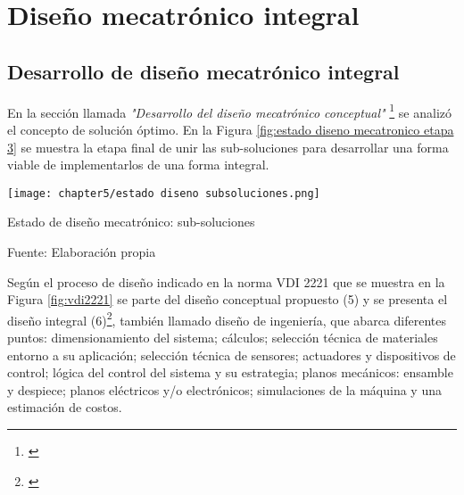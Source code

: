 
\pagestyle{myportland}
\doublespacing
\chapter[\quad\quad\quad\quad ----- Diseño mecatrónico integral]{\\ Diseño mecatrónico integral}
\thispagestyle{myportland}


\section{Desarrollo de diseño mecatrónico integral}
\label{sec:desarrollo de diseno mecatronico integral}

En la sección llamada \textit{"Desarrollo del diseño mecatrónico conceptual"} \footnote{\cite{DiazVergara2020}} se analizó el concepto de solución óptimo. En la Figura \ref{fig:estado diseno mecatronico etapa 3} se muestra la etapa final de unir las sub-soluciones para desarrollar una forma viable de implementarlos de una forma integral.

\begin{myfigure}[H]
	\footnotesize\centering
	\texttt{[image: chapter5/estado diseno subsoluciones.png]}
	\caption{Estado de diseño mecatrónico: sub-soluciones}
	\begin{myflushcenter}
		Fuente: Elaboración propia
	\end{myflushcenter}
	\label{fig:estado diseno mecatronico etapa 3}
\end{myfigure}

Según el proceso de diseño indicado en la norma VDI 2221 que se muestra en la Figura \ref{fig:vdi2221} se parte del diseño conceptual propuesto (5) y se presenta el diseño integral (6)\footnote{\cite{Pahl2007}}, también llamado diseño de ingeniería, que abarca diferentes puntos: dimensionamiento del sistema; cálculos; selección técnica de materiales entorno a su aplicación; selección técnica de sensores; actuadores y dispositivos de control; lógica del control del sistema y su estrategia; planos mecánicos: ensamble y despiece; planos eléctricos y/o electrónicos; simulaciones de la máquina y una estimación de costos.

